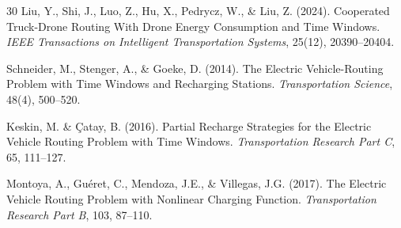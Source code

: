 \documentclass[11pt,a4paper]{article}
\begin{document}
\begin{thebibliography}{30}
 Liu, Y., Shi, J., Luo, Z., Hu, X., Pedrycz, W., \& Liu, Z. (2024).
Cooperated Truck-Drone Routing With Drone Energy Consumption and Time Windows.
\textit{IEEE Transactions on Intelligent Transportation Systems}, 25(12),
20390--20404.


 Schneider, M., Stenger, A., \& Goeke, D. (2014). The Electric
Vehicle-Routing Problem with Time Windows and Recharging Stations.
\textit{Transportation Science}, 48(4), 500--520.

 Keskin, M. \& \c{C}atay, B. (2016). Partial Recharge Strategies
for the Electric Vehicle Routing Problem with Time Windows.
\textit{Transportation Research Part C}, 65, 111--127.

 Montoya, A., Gu\'eret, C., Mendoza, J.E., \& Villegas, J.G.
(2017). The Electric Vehicle Routing Problem with Nonlinear Charging Function.
\textit{Transportation Research Part B}, 103, 87--110.

\end{thebibliography}
\end{document}
